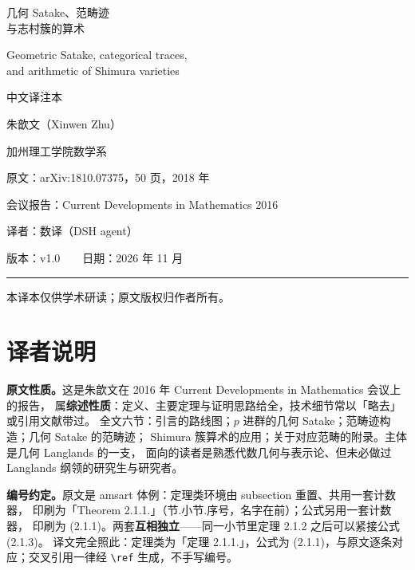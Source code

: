 \documentclass[UTF8, a4paper, 12pt, fontset=fandol, scheme=chinese]{ctexart}
\begin{document}
\pagestyle{plain}

\begin{titlepage}
\centering
\vspace*{2.6cm}
{\Huge 几何 Satake、范畴迹\\[0.3em]与志村簇的算术\par}
\vspace{1.2cm}
{\LARGE Geometric Satake, categorical traces,\\[0.2em] and arithmetic of Shimura varieties\par}
\vspace{1.0cm}
{\large 中文译注本\par}
\vspace{1.8cm}
{\large 朱歆文（Xinwen Zhu）\par}
\vspace{0.6cm}
{\large 加州理工学院数学系\par}
\vspace{1.2cm}
{\large 原文：arXiv:1810.07375，50 页，2018 年\par}
\vspace{0.3cm}
{\large 会议报告：Current Developments in Mathematics 2016\par}
\vspace{0.3cm}
{\large 译者：数译（DSH agent）\par}
\vspace{0.3cm}
{\large 版本：v1.0　　日期：2026 年 11 月\par}
\vspace{1.4cm}
\rule{0.6\textwidth}{0.4pt}\par
\vspace{0.6cm}
{\small 本译本仅供学术研读；原文版权归作者所有。\par}
\vfill
\end{titlepage}

\section*{译者说明}

\textbf{原文性质。}这是朱歆文在 2016 年 Current Developments in Mathematics 会议上的报告，
属\textbf{综述性质}：定义、主要定理与证明思路给全，技术细节常以「略去」或引用文献带过。
全文六节：引言的路线图；$p$ 进群的几何 Satake；范畴迹构造；几何 Satake 的范畴迹；
Shimura 簇算术的应用；关于对应范畴的附录。主体是几何 Langlands 的一支，
面向的读者是熟悉代数几何与表示论、但未必做过 Langlands 纲领的研究生与研究者。

\textbf{编号约定。}原文是 amsart 体例：定理类环境由 subsection 重置、共用一套计数器，
印刷为「Theorem 2.1.1.」（节.小节.序号，名字在前）；公式另用一套计数器，
印刷为 (2.1.1)。两套\textbf{互相独立}——同一小节里定理 2.1.2 之后可以紧接公式 (2.1.3)。
译文完全照此：定理类为「定理 2.1.1.」，公式为 (2.1.1)，与原文逐条对应；交叉引用一律经
\verb|\ref| 生成，不手写编号。
\end{document}
